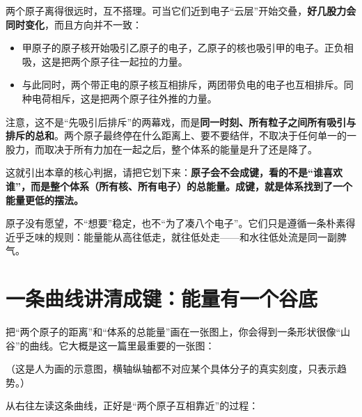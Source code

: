 两个原子离得很远时，互不搭理。可当它们近到电子“云层”开始交叠，\textbf{好几股力会同时变化}，而且方向并不一致：

\begin{itemize}[itemsep=2pt]
\item 甲原子的原子核开始吸引乙原子的电子，乙原子的核也吸引甲的电子。正负相吸，这是把两个原子往一起拉的力量。
\item 与此同时，两个带正电的原子核互相排斥，两团带负电的电子也互相排斥。同种电荷相斥，这是把两个原子往外推的力量。
\end{itemize}

注意，这不是“先吸引后排斥”的两幕戏，而是\textbf{同一时刻、所有粒子之间所有吸引与排斥的总和}。两个原子最终停在什么距离上、要不要结伴，不取决于任何单一的一股力，而取决于所有力加在一起之后，整个体系的能量是升了还是降了。

这就引出本章的核心判据，请把它划下来：\textbf{原子会不会成键，看的不是“谁喜欢谁”，而是整个体系（所有核、所有电子）的总能量。成键，就是体系找到了一个能量更低的摆法。}

原子没有愿望，不“想要”稳定，也不“为了凑八个电子”。它们只是遵循一条朴素得近乎乏味的规则：能量能从高往低走，就往低处走——和水往低处流是同一副脾气。

\section{一条曲线讲清成键：能量有一个谷底}

把“两个原子的距离”和“体系的总能量”画在一张图上，你会得到一条形状很像“山谷”的曲线。它大概是这一篇里最重要的一张图：

\begin{center}
\end{center}

（这是人为画的示意图，横轴纵轴都不对应某个具体分子的真实刻度，只表示趋势。）

从右往左读这条曲线，正好是“两个原子互相靠近”的过程：

